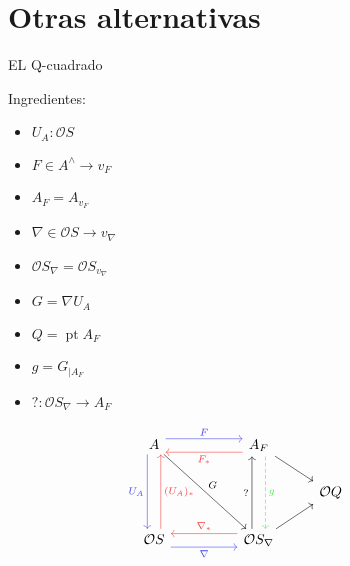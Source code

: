 \documentclass[compress,12pt]{beamer}
\DeclareMathOperator{\pt}{pt}
\begin{document}
\section{Otras alternativas}
\begin{frame}[fragile]{EL Q-cuadrado}
	\begin{block}{Ingredientes:}
		\begin{multicols}{3}
		
		 \begin{itemize}
			\item $U_A\colon \mathcal{O}S$
			\item $F\in A^\wedge \rightarrow v_F$
			\item $A_F=A_{v_F}$
			\item $\nabla\in \mathcal{O}S \rightarrow v_\nabla$
			\item $\mathcal{O}S_\nabla=\mathcal{O}S_{v_\nabla}$
			\item $G=\nabla U_A$
			\item $Q=\pt A_F$
			\item $g=G_{\mid A_F}$
			\item $?\colon \mathcal{O}S_\nabla\to A_F$
		 \end{itemize}
		
		\end{multicols}
	\end{block}
\[\begin{tikzcd}
	A && {A_F} && {} \\
	&&& {\mathcal{O}Q} \\
	{\mathcal{O}S} && {\mathcal{O}S_\nabla}
	\arrow["F", shift left=2, color={rgb,255:red,67;green,67;blue,239}, from=1-1, to=1-3]
	\arrow["{U_A}"', shift right=2, color={rgb,255:red,67;green,67;blue,239}, from=1-1, to=3-1]
	\arrow["G", from=1-1, to=3-3]
	\arrow["{F_*}", shift left=2, color={rgb,255:red,245;green,61;blue,61}, from=1-3, to=1-1]
	\arrow[from=1-3, to=2-4]
	\arrow["g", shift left=2, color={rgb,255:red,69;green,237;blue,72}, dashed, from=1-3, to=3-3]
	\arrow["{(U_A)_*}"', shift right=2, color={rgb,255:red,245;green,61;blue,61}, from=3-1, to=1-1]
	\arrow["\nabla"', shift right=2, color={rgb,255:red,67;green,67;blue,239}, from=3-1, to=3-3]
	\arrow["{?}", shift left=2, from=3-3, to=1-3]
	\arrow[from=3-3, to=2-4]
	\arrow["{\nabla_*}"', shift right=2, color={rgb,255:red,245;green,61;blue,61}, from=3-3, to=3-1]
\end{tikzcd}\]
\end{frame}
\end{document}
